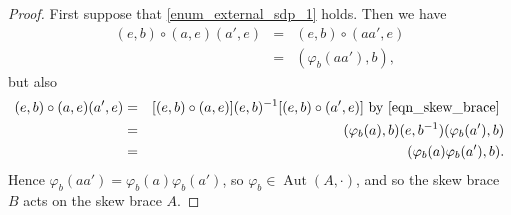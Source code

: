 \documentclass[12pt,a4paper, reqno]{amsart}
\theoremstyle{definition}
\DeclareMathOperator{\Aut}{\mbox{Aut}}
\begin{document}
\begin{proof}
First suppose that \ref{enum_external_sdp_1} holds. Then we have
\begin{eqnarray*}
(e,b) \circ (a,e)(a',e) & = & (e,b) \circ (aa',e) \\
& = & (\varphi_{b}(aa'),b), 
\end{eqnarray*}
but also
\begin{eqnarray*}
(e,b) \circ (a,e)(a',e) & = & [(e,b) \circ (a,e)] (e,b)^{-1} [(e,b) \circ (a',e)] \mbox{ by \eqref{eqn_skew_brace} } \\
& = & (\varphi_{b}(a),b)(e,b^{-1}) (\varphi_{b}(a'),b) \\
& = & (\varphi_{b}(a)\varphi_{b}(a'),b).
\end{eqnarray*}
Hence $ \varphi_{b}(aa') = \varphi_{b}(a)\varphi_{b}(a') $, so $ \varphi_{b} \in \Aut(A,\cdot) $, and so the skew brace $ B $ acts on the skew brace $ A $. 


\end{proof}
\end{document}
